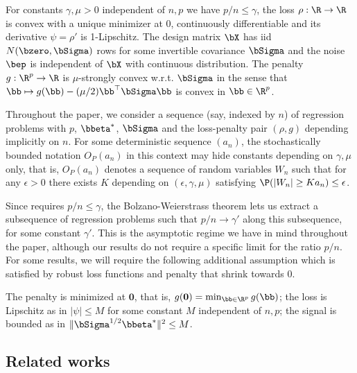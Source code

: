 \documentclass{colt2022} %
\numberwithin{equation}{section}
\begin{document}
\begin{assumption}
    \label{assumMain}
    For constants $\gamma,\mu>0$ 
    independent of $n,p$ we have $p/n\le \gamma$,
    the loss $\rho:\R\to\R$ is convex with a unique minimizer at 0, 
    continuously differentiable
    and its derivative $\psi=\rho'$ is 1-Lipschitz.
    The design matrix $\bX$ has iid $N(\bzero,\bSigma)$ rows for some
    invertible covariance $\bSigma$ and the noise $\bep$ is independent
    of $\bX$ with continuous distribution.
    The penalty $g:\R^p\to\R$ is {$\mu$-strongly} convex w.r.t. $\bSigma$ in the sense that
    $\bb \mapsto g(\bb) - (\mu/2) \bb^\top\bSigma \bb$ is convex in $\bb\in\R^p$.
\end{assumption}

Throughout the paper, we consider a sequence (say, indexed by $n$)
of regression problems with $p$, $\bbeta^*$, $\bSigma$ and the loss-penalty
pair $(\rho,g)$ depending implicitly on $n$.
For some deterministic sequence $(a_n)$,
the stochastically bounded notation $O_P(a_n)$ in this context
may hide constants depending on $\gamma,\mu$ only, that is,
$O_P(a_n)$ denotes a sequence of random variables $W_n$ such that
for any $\epsilon>0$ there exists $K$ depending on $(\epsilon,\gamma,\mu)$
satisfying $\P(|W_n|\ge K a_n ) \le \epsilon$.

Since  requires $p/n\le \gamma$, the Bolzano-Weierstrass theorem lets us extract a subsequence of regression problems 
such that $p/n\to\gamma'$
along this subsequence, for some constant $\gamma'$.
This is the asymptotic regime  we have in mind throughout the paper,
although our results do not require a specific limit for the ratio $p/n$.
For some results, we will require the following additional assumption
which is satisfied by
robust loss functions and penalty that shrink towards 0.

\begin{assumption}
    \label{assumAdditional}
    The penalty is minimized at $\mathbf 0$,
    that is, $g(\mathbf{0}) = \min_{\bb\in\R^p} g(\bb)$;
    the loss is Lipschitz as in
    $|\psi|\le M$ for some constant $M$ independent of $n,p$;
    the signal is bounded as in
    $\|\bSigma^{1/2}\bbeta^*\|^2\le M$.
\end{assumption}

\subsection{Related works}
\label{sec:related}
\end{document}
